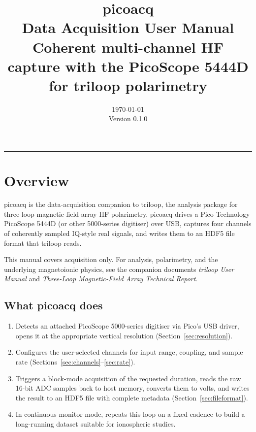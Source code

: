\documentclass[11pt]{article}
\title{\Large\bfseries picoacq\\[2pt]
       \large Data Acquisition User Manual\\[8pt]
       \normalsize Coherent multi-channel HF capture with the
       PicoScope 5444D for triloop polarimetry}
\author{}
\date{\today \\[6pt] \small Version 0.1.0}
\begin{document}
\maketitle

\tableofcontents
\bigskip\hrule\bigskip

\section{Overview}

\textsf{picoacq} is the data-acquisition companion to \textsf{triloop},
the analysis package for three-loop magnetic-field-array HF polarimetry.
\textsf{picoacq} drives a Pico Technology PicoScope 5444D (or other
5000-series digitiser) over USB, captures four channels of coherently
sampled IQ-style real signals, and writes them to an HDF5 file format
that \textsf{triloop} reads.

This manual covers acquisition only.  For analysis, polarimetry, and
the underlying magnetoionic physics, see the companion documents
\textsl{triloop User Manual} and \textsl{Three-Loop Magnetic-Field
Array Technical Report}.

\subsection{What \textsf{picoacq} does}

\begin{enumerate}\itemsep=2pt
\item Detects an attached PicoScope 5000-series digitiser via Pico's USB
      driver, opens it at the appropriate vertical resolution
      (Section~\ref{sec:resolution}).
\item Configures the user-selected channels for input range, coupling,
      and sample rate (Sections~\ref{sec:channels}--\ref{sec:rate}).
\item Triggers a block-mode acquisition of the requested duration,
      reads the raw 16-bit ADC samples back to host memory, converts
      them to volts, and writes the result to an HDF5 file with
      complete metadata (Section~\ref{sec:fileformat}).
\item In continuous-monitor mode, repeats this loop on a fixed cadence
      to build a long-running dataset suitable for ionospheric studies.
\end{enumerate}
\end{document}
